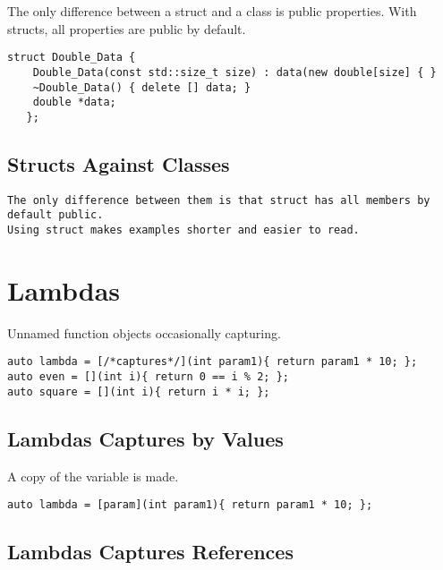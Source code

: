 The only difference between a struct and a class is public properties. With
structs, all properties are public by default.

\begin{verbatim}
struct Double_Data {
    Double_Data(const std::size_t size) : data(new double[size] { }
    ~Double_Data() { delete [] data; }
    double *data;
   };
\end{verbatim}

\subsection{Structs Against Classes}

\begin{verbatim}
The only difference between them is that struct has all members by default public.
Using struct makes examples shorter and easier to read. 
\end{verbatim}

\section{Lambdas}

Unnamed function objects occasionally capturing.

\begin{verbatim}
auto lambda = [/*captures*/](int param1){ return param1 * 10; };
auto even = [](int i){ return 0 == i % 2; };
auto square = [](int i){ return i * i; }; 
\end{verbatim}

\subsection{Lambdas Captures by Values}

A copy of the variable is made.

\begin{verbatim}
auto lambda = [param](int param1){ return param1 * 10; };
\end{verbatim}

\subsection{Lambdas Captures References}

